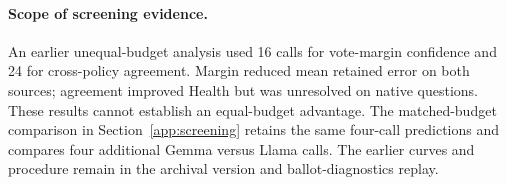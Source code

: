 \paragraph{Scope of screening evidence.}
An earlier unequal-budget analysis used 16 calls for vote-margin confidence and 24 for cross-policy agreement. Margin reduced mean retained error on both sources; agreement improved Health but was unresolved on native questions. These results cannot establish an equal-budget advantage. The matched-budget comparison in Section~\ref{app:screening} retains the same four-call predictions and compares four additional Gemma versus Llama calls. The earlier curves and procedure remain in the archival version and ballot-diagnostics replay.

